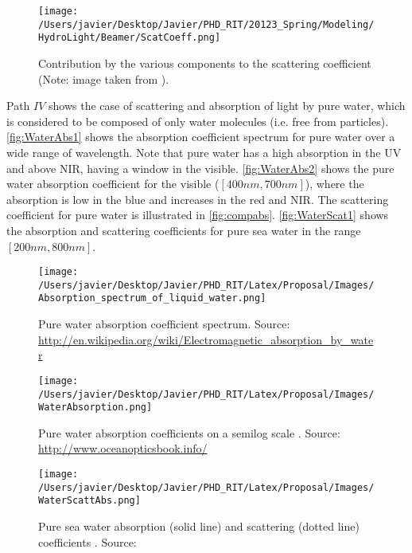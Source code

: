 \begin{figure}[htb]
\centering
      \texttt{[image: /Users/javier/Desktop/Javier/PHD\_RIT/20123\_Spring/Modeling/HydroLight/Beamer/ScatCoeff.png]}
      \caption{Contribution by the various components to the scattering coefficient (Note: image taken from \citet{Mobley:2001}).}
      \label{fig:compscat}
\end{figure}

Path $IV$ shows the case of scattering and absorption of light by pure water, which is considered to be composed of only water molecules (i.e. free from particles). \autoref{fig:WaterAbs1} shows the absorption coefficient spectrum for pure water over a wide range of wavelength. Note that pure water has a high absorption in the UV and above NIR, having a window in the visible. \autoref{fig:WaterAbs2} shows the pure water absorption coefficient for the visible ($[400nm,700nm]$), where the absorption is low in the blue and increases in the red and NIR. The scattering coefficient for pure water is illustrated in \autoref{fig:compabs}. \autoref{fig:WaterScat1} shows the absorption and scattering coefficients for pure sea water in the range $[200nm,800nm]$.

\begin{figure}[!ht]
  \centering
      \texttt{[image: /Users/javier/Desktop/Javier/PHD\_RIT/Latex/Proposal/Images/Absorption\_spectrum\_of\_liquid\_water.png]}
  \caption{Pure water absorption coefficient spectrum. Source: \protect\url{http://en.wikipedia.org/wiki/Electromagnetic_absorption_by_water}}
  \label{fig:WaterAbs1}
\end{figure}

\begin{figure}[!ht]
  \centering
      \texttt{[image: /Users/javier/Desktop/Javier/PHD\_RIT/Latex/Proposal/Images/WaterAbsorption.png]}
  \caption{Pure water absorption coefficients on a semilog scale \citep{Pope1997}.  Source: \protect\url{http://www.oceanopticsbook.info/}}
  \label{fig:WaterAbs2}
\end{figure}

\begin{figure}[!ht]
  \centering
      \texttt{[image: /Users/javier/Desktop/Javier/PHD\_RIT/Latex/Proposal/Images/WaterScattAbs.png]}
  \caption{Pure sea water absorption (solid line)  and scattering (dotted line) coefficients \citep{Smith1981}. Source: \citet{Mobley1994}}
  \label{fig:WaterScat1}
\end{figure}

